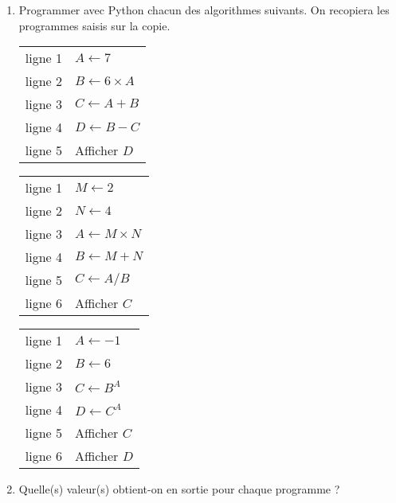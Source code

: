 \begin{enumerate}
\item Programmer avec Python chacun des algorithmes suivants. On recopiera les
programmes saisis sur la copie.
      
      \begin{minipage}{6cm}
      \begin{tabularx}{0.7\linewidth}{|c|X|}
      \hline
      ligne 1 & $ A \gets 7 $ \\
      ligne 2 & $ B \gets 6 \times A $ \\
      ligne 3 & $ C \gets A+B $ \\
      ligne 4 & $ D \gets B-C $ \\
      ligne 5 & Afficher $ D $ \\
      \hline
      \end{tabularx}
      \end{minipage}
      \begin{minipage}{6cm}
      \begin{tabularx}{0.7\linewidth}{|c|X|}
      \hline
      ligne 1 & $ M \gets 2 $ \\
      ligne 2 & $ N \gets 4 $ \\
      ligne 3 & $ A \gets M \times N $ \\
      ligne 4 & $ B \gets M+N $ \\
      ligne 5 & $ C \gets A/B $ \\
      ligne 6 & Afficher $ C $ \\
      \hline
      \end{tabularx}
      \end{minipage}
      \begin{minipage}{6cm}
      \begin{tabularx}{0.7\linewidth}{|c|X|}
      \hline
      ligne 1 & $ A \gets -1 $ \\
      ligne 2 & $ B \gets 6 $ \\
      ligne 3 & $ C \gets B^{A} $ \\
      ligne 4 & $ D \gets C^{A} $ \\
      ligne 5 & Afficher $ C $ \\
      ligne 6 & Afficher $ D $ \\
      \hline
      \end{tabularx}
      \end{minipage}
\item Quelle(s) valeur(s) obtient-on en sortie pour chaque programme ?
\end{enumerate}
\vspace{4cm}

